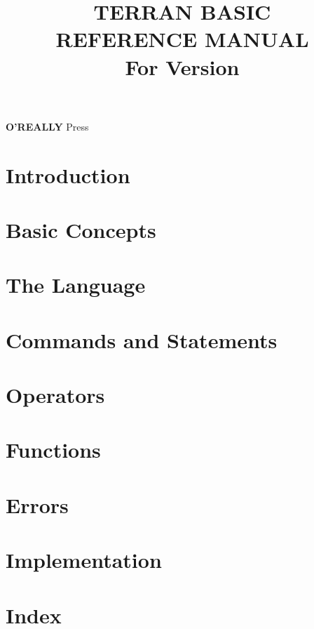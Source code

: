 \documentclass[10pt, stock, openany]{memoir}
\title{\HUGE\textbf{TERRAN BASIC \\ REFERENCE MANUAL} \\ \Large \vspace{1em} For Version \tbasver \\ \vspace{7mm} \theedition}
\date{}
\author{}
\newcommand{\oreallypress}{\large\textbf{O'REALLY\raisebox{1ex}{\scriptsize ?}} \normalsize Press}
\begin{document}
\begin{titlingpage}
\maketitle{}
\vfill
\oreallypress
\end{titlingpage}

\setcounter{page}{3}

\tableofcontents*



\openright
\chapter{Introduction}


\openany
\chapter{Basic Concepts}


\chapter{The Language}


\chapter{Commands and Statements}


\chapter{Operators}



\chapter{Functions}



\chapter{Errors}



\chapter{Implementation}




\chapter{Index}




\afterpage{\pagestyle{empty}\null\newpage}
\end{document}
